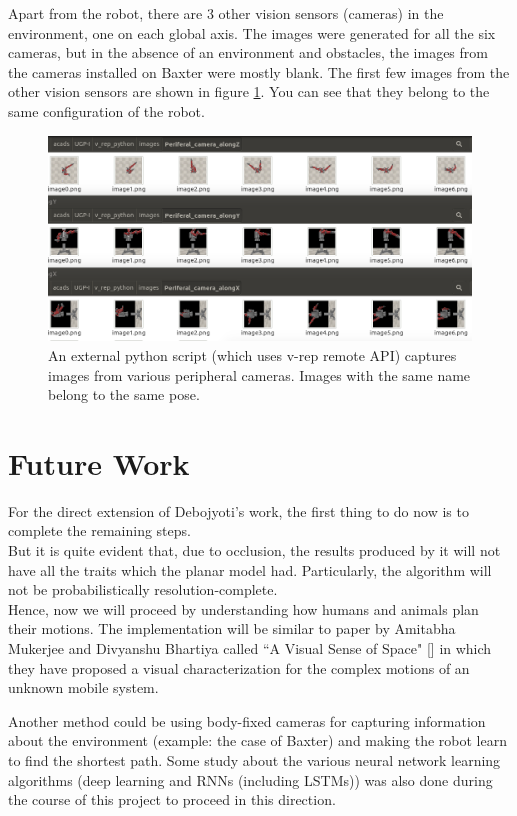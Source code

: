 \documentclass[12pt]{article}
\begin{document}
Apart from the robot, there are 3 other vision sensors (cameras) in the environment, one on each global axis. The images were generated for all the six cameras, but in the absence of an environment and obstacles, the images from the cameras installed on Baxter were mostly blank. The first few images from the other vision sensors are shown in figure \ref{Baxter}. You can see that they belong to the same configuration of the robot.

\begin{figure}
  \includegraphics[width=\columnwidth]{graphics/Baxter}
  \caption{An external python script (which uses v-rep remote API) captures images from various peripheral cameras. Images with the same name belong to the same pose.}
  \label{Baxter}
\end{figure}

\section{Future Work}
For the direct extension of Debojyoti's work, the first thing to do now is to complete the remaining steps.\\ But it is quite evident that, due to occlusion, the results produced by it will not have all the traits which the planar model had. Particularly, the algorithm will not be probabilistically resolution-complete.\\
Hence, now we will proceed by understanding how humans and animals plan their motions. The implementation will be similar to paper by Amitabha Mukerjee and Divyanshu Bhartiya called ``A Visual Sense of Space" [\cite{bica}] in which they have proposed a visual characterization for the complex motions of an unknown
mobile system.

Another method could be using body-fixed cameras for capturing information about the environment (example: the case of Baxter) and making the robot learn to find the shortest path. Some study about the various neural network learning algorithms (deep learning and RNNs (including LSTMs)) was also done during the course of this project to proceed in this direction.
\end{document}
